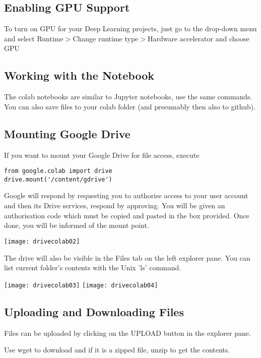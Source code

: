 \subsection{Enabling GPU Support}

To turn on GPU for your Deep Learning projects, just go to the drop-down menu and select Runtime$>$Change runtime type$>$Hardware accelerator and choose GPU

\subsection{Working with the Notebook}

The colab notebooks are similar to Jupyter notebooks, use the same commands.
You can also save files to your colab folder (and presumably then also to github).

\subsection{Mounting Google Drive}

If you want to mount your Google Drive for file access, execute

\begin{lstlisting}
from google.colab import drive
drive.mount('/content/gdrive')
\end{lstlisting}

Google will respond by requesting you to authorise access to your user account and then its Drive services, respond by approving. You will be given an authorisation code which must be copied and pasted in the box provided. Once done, you will be informed of the mount point.
\begin{marginfigure}
\texttt{[image: drivecolab02]}
\end{marginfigure}
The drive will also be visible in the Files tab on the left explorer pane.  You can list current folder's contents with the Unix 'ls' command.
\begin{marginfigure}
\texttt{[image: drivecolab03]}
\texttt{[image: drivecolab04]}
\end{marginfigure}

\subsection{Uploading and Downloading Files}

Files can be uploaded by clicking on the UPLOAD button in the explorer pane.


Use wget to download and if it is a zipped file, unzip to get the contents.

